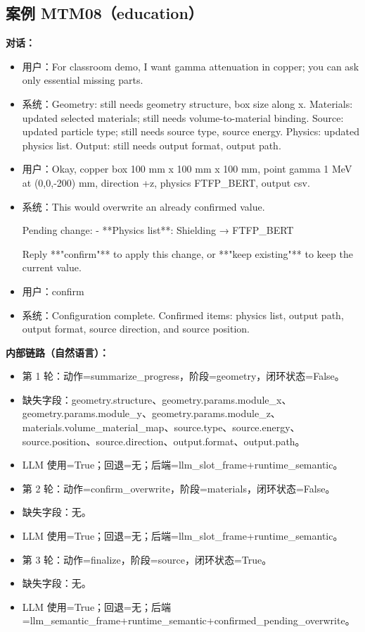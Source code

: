 \documentclass[11pt]{ctexart}
\begin{document}
\subsection{案例 MTM08（education）}
\textbf{对话：}
\begin{itemize}
\item 用户：For classroom demo, I want gamma attenuation in copper; you can ask only essential missing parts.
\item 系统：Geometry: still needs geometry structure, box size along x. Materials: updated selected materials; still needs volume-to-material binding. Source: updated particle type; still needs source type, source energy. Physics: updated physics list. Output: still needs output format, output path.
\item 用户：Okay, copper box 100 mm x 100 mm x 100 mm, point gamma 1 MeV at (0,0,-200) mm, direction +z, physics FTFP\_BERT, output csv.
\item 系统：This would overwrite an already confirmed value.

Pending change:
- **Physics list**: Shielding → FTFP\_BERT

Reply **"confirm"** to apply this change, or **"keep existing"** to keep the current value.
\item 用户：confirm
\item 系统：Configuration complete. Confirmed items: physics list, output path, output format, source direction, and source position.
\end{itemize}
\textbf{内部链路（自然语言）：}
\begin{itemize}
\item 第 1 轮：动作=summarize\_progress，阶段=geometry，闭环状态=False。
\item 缺失字段：geometry.structure、geometry.params.module\_x、geometry.params.module\_y、geometry.params.module\_z、materials.volume\_material\_map、source.type、source.energy、source.position、source.direction、output.format、output.path。
\item LLM 使用=True；回退=无；后端=llm\_slot\_frame+runtime\_semantic。
\item 第 2 轮：动作=confirm\_overwrite，阶段=materials，闭环状态=False。
\item 缺失字段：无。
\item LLM 使用=True；回退=无；后端=llm\_slot\_frame+runtime\_semantic。
\item 第 3 轮：动作=finalize，阶段=source，闭环状态=True。
\item 缺失字段：无。
\item LLM 使用=True；回退=无；后端=llm\_semantic\_frame+runtime\_semantic+confirmed\_pending\_overwrite。
\end{itemize}
\end{document}
